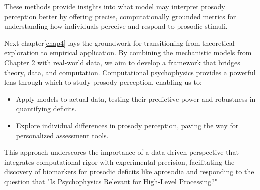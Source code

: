 These methods provide insights into what model may interpret prosody perception better by offering precise, computationally grounded metrics for understanding how individuals perceive and respond to prosodic stimuli.

Next chapter\ref{chap4} lays the groundwork for transitioning from theoretical exploration to empirical application. By combining the mechanistic models from Chapter 2 with real-world data, we aim to develop a framework that bridges theory, data, and computation. Computational psychophysics provides a powerful lens through which to study prosody perception, enabling us to:
\begin{itemize}
\item Apply models to actual data, testing their predictive power and robustness in quantifying deficits.
\item Explore individual differences in prosody perception, paving the way for personalized assessment tools.
\end{itemize}

This approach underscores the importance of a data-driven perspective that integrates computational rigor with experimental precision, facilitating the discovery of biomarkers for prosodic deficits like aprosodia and responding to the question that "Is Psychophysics Relevant for High-Level Processing?"